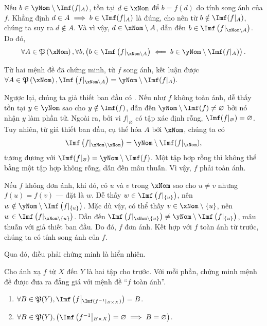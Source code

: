 Nếu $b \in \yNom \setminus \Imf(f|_A)$, tồn tại $d \in \xNom$ để $b = f(d)$ do tính song ánh của $f$. Khẳng định $d \in A \implies b \in \Imf(f|_A)$ là đúng, cho nên từ $b \notin \Imf(f|_A)$, chúng ta suy ra $d \notin A$. Và vì vậy, $d \in \xNom \setminus A$, dẫn đến $b \in \Imf\left(f|_{\xNom \setminus A}\right)$. Do đó, 
\begin{equation*}
   \forall A \in \mathfrak{P}\left(\xNom\right), \forall b, \left(b \in \Imf\left(f|_{\xNom \setminus A}\right) \impliedby b \in \yNom \setminus \Imf(f|_A)\right).
\end{equation*}

Từ hai mệnh đề đã chứng minh, từ $f$ song ánh, kết luận được $
   \forall A \in \mathfrak{P}\left(\xNom\right), \Imf\left(f|_{\xNom \setminus A}\right) = \yNom \setminus \Imf(f|_A).$

Ngược lại, chúng ta giả thiết ban đầu có . Nếu như $f$ không toàn ánh, dễ thấy tồn tại $y \in \yNom$ sao cho $y \notin \Imf(f)$, dẫn đến $\yNom \setminus \Imf(f) \neq \varnothing$ bởi nó nhận $y$ làm phần tử. Ngoài ra, bởi vì $f|_\varnothing$ có tập xác định rỗng, $\Imf(f|_\varnothing) = \varnothing$. Tuy nhiên, từ giả thiết ban đầu, cụ thể hóa $A$ bởi $\xNom$, chúng ta có \begin{equation*}
   \Imf\left(f|_{\xNom \setminus \xNom}\right) = \yNom \setminus \Imf(f|_{\xNom}),
\end{equation*}
tương đương với $\Imf(f|_\varnothing) = \yNom \setminus \Imf(f)$. Một tập hợp rỗng thì không thể bằng một tập hợp không rỗng, dẫn đến mâu thuẫn. Vì vậy, $f$ phải toàn ánh.

Nếu $f$ không đơn ánh, khi đó, có $u$ và $v$ trong $\xNom$ sao cho $u \neq v$ nhưng $f(u) = f(v)$ --- đặt là $w$. Dễ thấy $w \in \Imf\left(f|_{\{u\}}\right)$, nên $w \notin \yNom \setminus \Imf\left(f|_{\{u\}}\right)$. Mặc dù vậy, có thể thấy $v \in \xNom \setminus \{u\}$, nên $w \in \Imf\left(f|_{\xNom \setminus \{u\}}\right)$. Dẫn đến $\Imf\left(f|_{\xNom \setminus \{u\}}\right) \neq \yNom \setminus \Imf\left(f|_{\{u\}}\right)$, mâu thuẫn với giả thiết ban đầu. Do đó, $f$ đơn ánh. Kết hợp với $f$ toàn ánh từ trước, chúng ta có tính song ánh của $f$.

Qua đó, điều phải chứng minh là hiển nhiên.

\exercise Cho ánh xạ $f$ từ $X$ đến $Y$ là hai tập cho trước. Với mỗi phần, chứng minh mệnh đề được đưa ra đẳng giá với mệnh đề ``$f$ toàn ánh''.
\begin{enumerate}
   \item $\forall B \in \mathfrak{P}(Y), \Imf\left(f\middle|_{\Imf\left(f^{-1}\middle|_{B \times X}\right)}\right) = B$.
   \item $\forall B \in \mathfrak{P}(Y), \left(\Imf\left(f^{-1}\middle|_{B \times X}\right) = \varnothing \implies B = \varnothing\right)$.
\end{enumerate}

